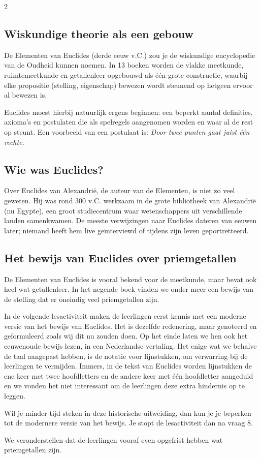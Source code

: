 \begin{multicols}{2}
 \subsection*{Wiskundige theorie als een gebouw}
 De Elementen van Euclides (derde eeuw v.C.) zou je de wiskundige encyclopedie van de Oudheid kunnen noemen. In 13 boeken worden de vlakke meetkunde,  ruimtemeetkunde en  getallenleer opgebouwd als één grote constructie, waarbij elke propositie (stelling, eigenschap) bewezen wordt steunend op hetgeen ervoor al bewezen is.
 
 
Euclides moest hierbij natuurlijk ergens beginnen: een beperkt aantal definities, axioma's en postulaten die als spelregels aangenomen worden en waar al de rest op steunt. Een voorbeeld van een postulaat is: \emph{Door twee punten gaat juist één rechte.}

 \subsection*{Wie was Euclides?}

 Over Euclides van Alexandrië, de auteur van de Elementen, is niet zo veel geweten. Hij was rond 300 v.C. werkzaam in de grote bibliotheek van Alexandrië (nu Egypte), een groot studiecentrum waar wetenschappers uit verschillende landen samenkwamen. De meeste verwijzingen naar Euclides dateren van eeuwen later; niemand heeft hem live geïnterviewd of tijdens zijn leven geportretteerd.

  \subsection*{Het bewijs van Euclides over priemgetallen}

 De Elementen van Euclides is vooral bekend voor de meetkunde, maar bevat ook heel wat getallenleer. In het negende boek vinden we onder meer een bewijs van de stelling dat er oneindig veel priemgetallen zijn.  
 
 In de volgende lesactiviteit maken de leerlingen eerst kennis met een moderne versie van het bewijs van Euclides. Het is dezelfde redenering, maar genoteerd en geformuleerd zoals wij dit nu zouden doen. Op het einde laten we hen ook het eeuwenoude bewijs lezen, in een Nederlandse vertaling. Het enige wat we behalve de taal aangepast hebben, is de notatie voor lijnstukken, om verwarring bij de leerlingen te vermijden. Immers, in de tekst van Euclides worden lijnstukken de ene keer met twee hoofdletters en de andere keer met één hoofdletter aangeduid en we vonden het niet interessant om de leerlingen deze extra hindernis op te leggen.

 Wil je minder tijd steken in deze historische uitweiding, dan kun je je beperken tot de modernere versie van het bewijs.
 Je stopt de lesactiviteit dan na vraag 8.
 
 We veronderstellen dat de leerlingen vooraf even opgefrist hebben wat priemgetallen zijn.

\end{multicols}
\clearpage
 
